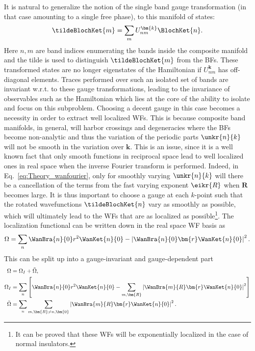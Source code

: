 It is natural to generalize the notion of the single band gauge transformation (in that case amounting to a single free phase), to this manifold of states:
\begin{equation}
	\tildeBlochKet{m} = \sum_m U_{nm}^{\bm{k}} \BlochKet{n}.
\end{equation}
Here $n,m$ are band indices enumerating the bands inside the composite manifold and the tilde is used to distinguish $\tildeBlochKet{m}$ from the BFs.
These transformed states are no longer eigenstates of the Hamiltonian if $U_{nm}^{\bm{k}}$ has off-diagonal elements.
Traces performed over such an isolated set of bands are invariant w.r.t. to these gauge transformations, leading to the invariance of observables such as the Hamiltonian which lies at the core of the ability to isolate and focus on this subproblem.
Choosing a decent gauge in this case becomes a necessity in order to extract well localized WFs.
This is because composite band manifolds, in general, will harbor crossings and degeneracies where the BFs become non-analytic and thus the variation of the periodic parts $\unkr{n}{k}$ will not be smooth in the variation over $\bm{k}$.
This is an issue, since it is a well known fact that only smooth functions in reciprocal space lead to well localized ones in real space when the inverse Fourier transform is performed.
Indeed, in Eq.~\eqref{eq:Theory_wanfourier}, only for smoothly varying $\unkr{n}{k}$ will there be a cancellation of the terms from the fast varying exponent $\eikr{R}$ when $\bm{R}$ becomes large.
It is thus important to choose a gauge at each $k$-point such that the rotated wavefunctions $\tildeBlochKet{n}$ vary as smoothly as possible, which will ultimately lead to the WFs that are as localized as possible\footnote{It can be proved that these WFs will be exponentially localized in the case of normal insulators.}. 
The localization functional can be written down in the real space WF basis as
\begin{equation}
	\label{eq:Theory_spread}
	\Omega =\sum_n \WanBra{n}{0}r^2\WanKet{n}{0} - \left|\WanBra{n}{0}\bm{r}\WanKet{n}{0}\right|^2.
\end{equation}
This can be split up into a gauge-invariant and gauge-dependent part
\begin{align}
	\Omega &= \Omega_I + \tilde\Omega,  \\
	\Omega_I &= \sum_n \left[\WanBra{n}{0} r^2 \WanKet{n}{0} - \sum_{m,\bm{R}} \left| \WanBra{m}{R} \bm{r} \WanKet{n}{0}\right|^2\right] \label{eq:Theory_omegaI}\\
	\tilde\Omega &= \sum_n \sum_{m,\bm{R} \neq n,\bm{0}} \left|\WanBra{m}{R} \bm{r} \WanKet{n}{0}\right|^2.
\end{align}
